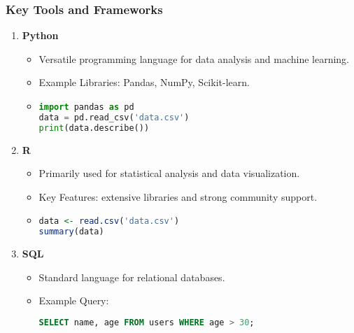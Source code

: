 \documentclass[aspectratio=169]{beamer}
\begin{document}
\begin{frame}[fragile]
    \frametitle{Key Tools and Frameworks}
    \begin{enumerate}
        \item \textbf{Python}
            \begin{itemize}
                \item Versatile programming language for data analysis and machine learning.
                \item Example Libraries: Pandas, NumPy, Scikit-learn.
                \item \begin{lstlisting}[language=Python]
import pandas as pd
data = pd.read_csv('data.csv')
print(data.describe())
                \end{lstlisting}
            \end{itemize}

        \item \textbf{R}
            \begin{itemize}
                \item Primarily used for statistical analysis and data visualization.
                \item Key Features: extensive libraries and strong community support.
                \item \begin{lstlisting}[language=R]
data <- read.csv('data.csv')
summary(data)
                \end{lstlisting}
            \end{itemize}

        \item \textbf{SQL}
            \begin{itemize}
                \item Standard language for relational databases.
                \item Example Query: 
                \begin{lstlisting}[language=SQL]
SELECT name, age FROM users WHERE age > 30;
                \end{lstlisting}
            \end{itemize}
    \end{enumerate}
\end{frame}
\end{document}

